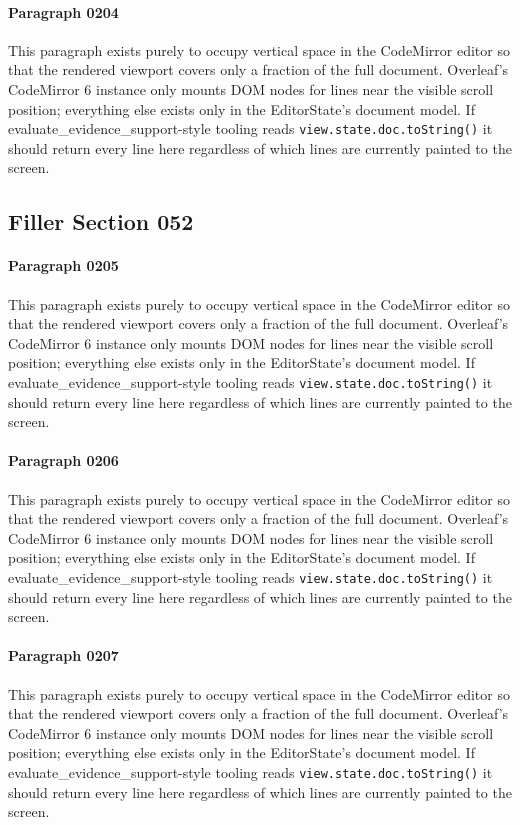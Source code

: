 \documentclass{article}
\begin{document}
\paragraph{Paragraph 0204}
This paragraph exists purely to occupy vertical space in the CodeMirror editor so that the rendered viewport covers only a fraction of the full document. Overleaf's CodeMirror 6 instance only mounts DOM nodes for lines near the visible scroll position; everything else exists only in the EditorState's document model. If evaluate\_evidence\_support-style tooling reads \texttt{view.state.doc.toString()} it should return every line here regardless of which lines are currently painted to the screen.

\subsection{Filler Section 052}
\paragraph{Paragraph 0205}
This paragraph exists purely to occupy vertical space in the CodeMirror editor so that the rendered viewport covers only a fraction of the full document. Overleaf's CodeMirror 6 instance only mounts DOM nodes for lines near the visible scroll position; everything else exists only in the EditorState's document model. If evaluate\_evidence\_support-style tooling reads \texttt{view.state.doc.toString()} it should return every line here regardless of which lines are currently painted to the screen.

\paragraph{Paragraph 0206}
This paragraph exists purely to occupy vertical space in the CodeMirror editor so that the rendered viewport covers only a fraction of the full document. Overleaf's CodeMirror 6 instance only mounts DOM nodes for lines near the visible scroll position; everything else exists only in the EditorState's document model. If evaluate\_evidence\_support-style tooling reads \texttt{view.state.doc.toString()} it should return every line here regardless of which lines are currently painted to the screen.

\paragraph{Paragraph 0207}
This paragraph exists purely to occupy vertical space in the CodeMirror editor so that the rendered viewport covers only a fraction of the full document. Overleaf's CodeMirror 6 instance only mounts DOM nodes for lines near the visible scroll position; everything else exists only in the EditorState's document model. If evaluate\_evidence\_support-style tooling reads \texttt{view.state.doc.toString()} it should return every line here regardless of which lines are currently painted to the screen.
\end{document}
